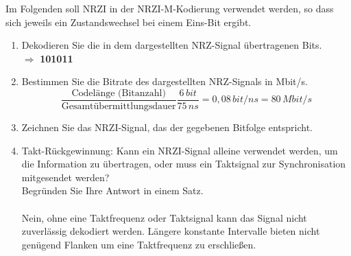 \documentclass[a4paper]{article}
\begin{document}
\noindent Im Folgenden soll NRZI in der NRZI-M-Kodierung verwendet werden, so dass sich jeweils ein Zustandswechsel bei einem Eins-Bit ergibt.
\begin{enumerate}[label=\alph*)]
    \item Dekodieren Sie die in dem dargestellten NRZ-Signal übertragenen Bits.\\
    $\Rightarrow$ \textbf{101011}
    \item Bestimmen Sie die Bitrate des dargestellten NRZ-Signals in Mbit/s.\\
    \[\frac{\text{Codelänge (Bitanzahl)}}{\text{Gesamtübermittlungsdauer}}\frac{6\, bit}{75\, ns}=0,08\, bit/ns = 80\, Mbit/s\]
    \item Zeichnen Sie das NRZI-Signal, das der gegebenen Bitfolge entspricht.\\
    \begin{center}
    \end{center}
    \item Takt-Rückgewinnung: Kann ein NRZI-Signal alleine verwendet werden, um die Information zu übertragen, oder muss ein Taktsignal zur Synchronisation mitgesendet werden?\\
    Begründen Sie Ihre Antwort in einem Satz. \\\\
    Nein, ohne eine Taktfrequenz oder Taktsignal kann das Signal nicht zuverlässig dekodiert werden. Längere konstante Intervalle bieten nicht genügend Flanken um eine Taktfrequenz zu erschließen.
\end{enumerate}
\clearpage 
\end{document}
